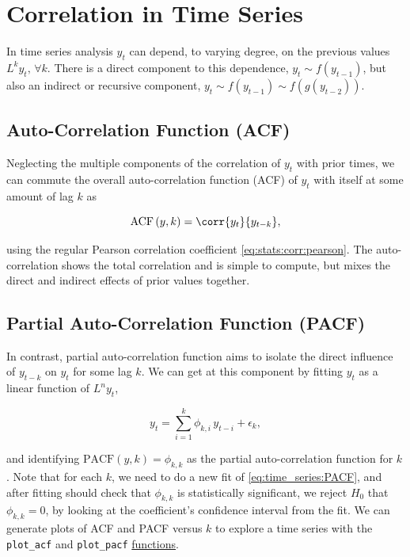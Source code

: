 \section{Correlation in Time Series}
\label{time_series:correlation}

In time series analysis $y_{t}$ can depend, to varying degree,
on the previous values $L^{k} y_{t},\, \forall k$.
There is a direct component to this dependence,
$y_{t} \sim f\left(y_{t-1}\right)$,
but also an indirect or recursive component,
$y_{t} \sim f\left(y_{t-1}\right) \sim f\left(g\left(y_{t-2}\right)\right)$.

\subsection{Auto-Correlation Function (ACF)}
\label{time_series:ACF}

Neglecting the multiple components of the correlation of $y_{t}$ with prior times,
we can commute the overall auto-correlation function (ACF) of $y_{t}$
with itself at some amount of lag $k$ as

\begin{equation}\label{eq:time_series:ACF}
\text{ACF}\left(y,k\right) = \corr{y_{t}}{y_{t-k}},
\end{equation}

\noindent using the regular Pearson correlation coefficient \cref{eq:stats:corr:pearson}.
The auto-correlation shows the total correlation and is simple to compute,
but mixes the direct and indirect effects of prior values together.

\subsection{Partial Auto-Correlation Function (PACF)}
\label{time_series:PACF}

In contrast, partial auto-correlation function
aims to isolate the direct influence of $y_{t-k}$ on $y_{t}$ for some lag $k$.
We can get at this component by fitting $y_{t}$ as a linear function of $L^{n} y_{t}$,

\begin{equation}\label{eq:time_series:PACF}
y_{t} = \sum_{i=1}^{k} \phi_{k,i}\, y_{t-i} + \epsilon_{k},
\end{equation}

\noindent and identifying $\text{PACF}\left(y,k\right) = \phi_{k,k}$
as the partial auto-correlation function for $k$.
Note that for each $k$, we need to do a new fit of \cref{eq:time_series:PACF},
and after fitting should check that $\phi_{k,k}$ is statistically significant,
\ie we reject $H_{0}$ that $\phi_{k,k}=0$, by looking at the coefficient's confidence interval from the fit.
We can generate plots of ACF and PACF versus $k$ to explore a time series
with the \texttt{plot\_acf} and \texttt{plot\_pacf}
\href{https://www.statsmodels.org/stable/graphics.html\#time-series-plots}{functions}.


